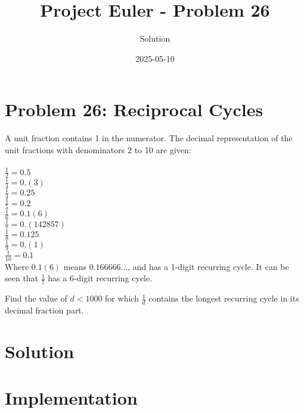\documentclass{article}
\title{Project Euler - Problem 26}
\author{Solution}
\date{2025-05-10}
\begin{document}
\maketitle

\section*{Problem 26: Reciprocal Cycles}

A unit fraction contains 1 in the numerator. The decimal representation of the unit fractions with denominators 2 to 10 are given:
\\\\
$\frac{1}{2} = 0.5$ \\
$\frac{1}{3} = 0.(3)$ \\
$\frac{1}{4} = 0.25$ \\
$\frac{1}{5} = 0.2$ \\
$\frac{1}{6} = 0.1(6)$ \\
$\frac{1}{7} = 0.(142857)$ \\
$\frac{1}{8} = 0.125$ \\
$\frac{1}{9} = 0.(1)$ \\
$\frac{1}{10} = 0.1$ \\

Where $0.1(6)$ means $0.166666...$, and has a 1-digit recurring cycle. It can be seen that $\frac{1}{7}$ has a 6-digit recurring cycle.

Find the value of $d < 1000$ for which $\frac{1}{d}$ contains the longest recurring cycle in its decimal fraction part.

\section*{Solution}

\section*{Implementation}
\end{document}
